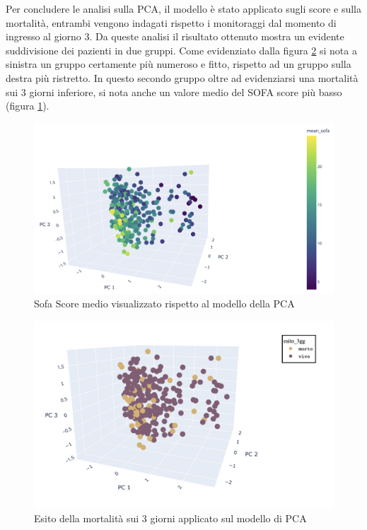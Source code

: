 Per concludere le analisi sulla PCA, il modello è stato applicato sugli score e sulla mortalità, entrambi vengono indagati rispetto i monitoraggi dal momento di ingresso al giorno 3.
Da queste analisi il risultato ottenuto mostra un evidente suddivisione dei pazienti in due gruppi. Come evidenziato dalla figura \ref{fig:esiti} si nota a sinistra un gruppo certamente più numeroso e fitto, rispetto ad un gruppo sulla destra più ristretto. In questo secondo gruppo oltre ad evidenziarsi una mortalità sui 3 giorni inferiore, si nota anche un valore medio del SOFA score più basso (figura \ref{fig:sofa}).

\begin{figure}[h]
	\centering
	\includegraphics[width=12cm]{capitolo3/sofa.png}
	\caption{Sofa Score medio visualizzato rispetto al modello della PCA}
	\label{fig:sofa}
\end{figure}
\begin{figure}[h]
	\centering
	\includegraphics[width=12cm]{capitolo3/esiti.png}
	\caption{Esito della mortalità sui 3 giorni applicato sul modello di PCA}
	\label{fig:esiti}
\end{figure}

